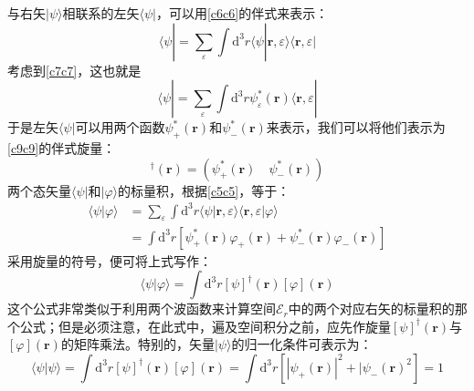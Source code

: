 \documentclass[]{article}
\begin{document}
与右矢$|\psi\rangle$相联系的左矢$\langle\psi|$，可以用\eqref{c6c6}的伴式来表示：
\begin{equation}
	\langle\psi|=\sum\limits_{\varepsilon}\int\mathrm{d}^3r\langle\psi|\boldsymbol{r},\varepsilon\rangle\langle \boldsymbol{r},\varepsilon|
\end{equation}
考虑到\eqref{c7c7}，这也就是
\begin{equation}
	\langle\psi|=\sum\limits_{\varepsilon}\int\mathrm{d}^3r\psi_{\varepsilon}^*(\boldsymbol{r})\langle \boldsymbol{r},\varepsilon|
\end{equation}
于是左矢$\langle\psi|$可以用两个函数$\psi_{+}^*(\boldsymbol{r})$和$\psi_{-}^*(\boldsymbol{r})$来表示，我们可以将他们表示为\eqref{c9c9}的伴式旋量：
\begin{equation}
	[\psi]^\dagger(\boldsymbol{r})=(\psi_{+}^*(\boldsymbol{r})\quad\psi_{-}^*(\boldsymbol{r}))
\end{equation}
两个态矢量$\langle\psi|$和$|\varphi\rangle$的标量积，根据\eqref{c5c5}，等于：
\begin{align}
	\langle\psi|\varphi\rangle&=\sum\limits_{\varepsilon}\int\mathrm{d}^3r\langle\psi|\boldsymbol{r},\varepsilon\rangle\langle \boldsymbol{r},\varepsilon|\varphi\rangle\nonumber\\
	&=\int\mathrm{d}^3r[\psi^*_+(\boldsymbol{r})\varphi_+(\boldsymbol{r})+\psi_-^*(\boldsymbol{r})\varphi_-(\boldsymbol{r})]
\end{align}
采用旋量的符号，便可将上式写作：
\begin{equation}
	\langle\psi|\varphi\rangle=\int\mathrm{d}^3r[\psi]^\dagger(\boldsymbol{r})[\varphi](\boldsymbol{r} )
\end{equation}
这个公式非常类似于利用两个波函数来计算空间$\mathscr{E}_r$中的两个对应右矢的标量积的那个公式；但是必须注意，在此式中，遍及空间积分之前，应先作旋量$[\psi]^\dagger(\boldsymbol{r})$与$[\varphi](\boldsymbol{r} )$的矩阵乘法。特别的，矢量$|\psi\rangle$的归一化条件可表示为：
\begin{equation}
	\langle \psi|\psi\rangle=\int\mathrm{d}^3r[\psi]^\dagger(\boldsymbol{r})[\varphi](\boldsymbol{r} )=\int\mathrm{d}^3r[|\psi_+(\boldsymbol{r})|^2+|\psi_-(\boldsymbol{r})^2]=1
\end{equation}
\end{document}
